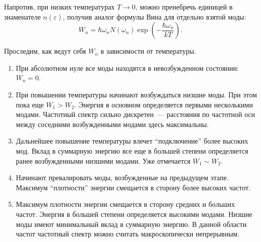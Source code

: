     Напротив, при низких температурах $T \to 0$, можно пренебречь единицей в знаменателе $n(\varepsilon)$, получив аналог формулы Вина для отдельно взятой моды:
    \begin{equation}
        W_n = \hbar\omega_n N(\omega_n) \exp(- \frac{\hbar\omega_n}{kT}) .
    \end{equation}

    Проследим, как ведут себя $W_n$ в зависимости от температуры.
    \begin{enumerate}[nosep]
        \item При абсолютном нуле все моды находятся в невозбужденном состоянии: $W_n = 0$.

        \item При повышении температуры начинают возбуждаться низшие моды. При этом пока еще $W_1 > W_2$. Энергия в основном определяется первыми несколькими модами. Частотный спектр сильно дискретен~--- расстояния по частотной оси между соседними возбужденными модами здесь максимальны.

        \item Дальнейшее повышение температуры влечет \enquote{подключение} более высоких мод. Вклад в суммарную энергию все еще в большей степени определяется ранее возбужденными низшими модами. Уже отмечается $W_1 \sim W_2$.

        \item Начинают превалировать моды, возбужденные на предыдущем этапе. Максимум \enquote{плотности} энергии смещается в сторону более высоких частот.

        \item Максимум плотности энергии смещается в сторону средних и больших частот. Энергия в большей степени определяется высокими модами. Низшие моды имеют минимальный вклад в суммарную энергию. В данной области частот частотный спектр можно считать макроскопически непрерывным.
    \end{enumerate}

